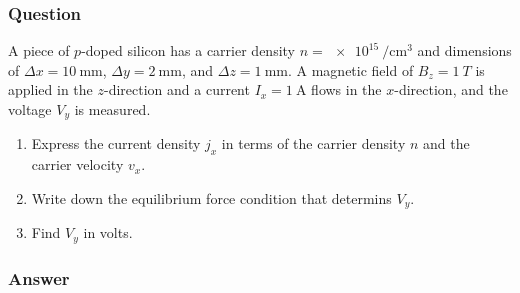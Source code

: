 \subsubsection{Question}

A piece of $p$-doped silicon has a carrier density 
$n=\SI{e15}{\per\cm\cubed}$ and dimensions of $Δx = \SI{10}{\mm}$, $Δy = 
\SI{2}{\mm}$, and $Δz = \SI{1}{\mm}$. A magnetic field of $B_z = \SI{1}{T}$ 
is applied in the $z$-direction and a current $I_x = \SI{1}{\A}$ flows in 
the $x$-direction, and the voltage $V_y$ is measured.
\begin{enumerate}
	\item
		Express the current density $j_x$ in terms of the carrier density $n$
		and the carrier velocity $v_x$.
	\item
		Write down the equilibrium force condition that determins $V_y$.
	\item
		Find $V_y$ in volts.
\end{enumerate}

\subsubsection{Answer}
